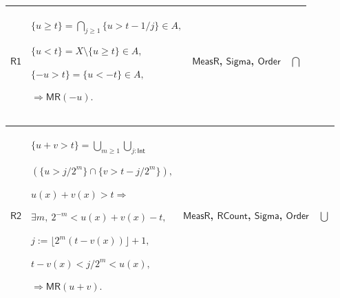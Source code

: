 \documentclass[11pt]{amsart}
\newlength{\FTCFourColumnBody}
\begin{document}
{\noindent
\begin{tabular}{|@{}>{\centering\arraybackslash}m{0.078431\FTCFourColumnBody}|>{\centering\arraybackslash}m{0.535947\FTCFourColumnBody}|>{\centering\arraybackslash}m{0.281045\FTCFourColumnBody}|>{\centering\arraybackslash}m{0.104575\FTCFourColumnBody}|}\hline
\hypertarget{dct:R1}{$\displaystyle \textsf{R1}$} & $\displaystyle \{u\ge t\}=\bigcap_{j\ge1}\{u>t-1/j\}\in A,$\par
$\displaystyle \{u<t\}=X\setminus\{u\ge t\}\in A,$\par
$\displaystyle \{-u>t\}=\{u<-t\}\in A,$\par
$\displaystyle \Rightarrow\textsf{MR}(-u).$ & \hyperlink{dctdef:MeasR}{$\displaystyle \textsf{MeasR}$}, \hyperlink{ax:Sigma}{$\displaystyle \textsf{Sigma}$}, \hyperlink{ax:Order}{$\displaystyle \textsf{Order}$} & $\displaystyle \bigcap$\\ \hline
\end{tabular}%
\par\setlength{\parskip}{0pt}\nointerlineskip
\noindent
\begin{tabular}{|@{}>{\centering\arraybackslash}m{0.078431\FTCFourColumnBody}|>{\centering\arraybackslash}m{0.535947\FTCFourColumnBody}|>{\centering\arraybackslash}m{0.281045\FTCFourColumnBody}|>{\centering\arraybackslash}m{0.104575\FTCFourColumnBody}|}\hline
\hypertarget{dct:R2}{$\displaystyle \textsf{R2}$} & $\displaystyle \{u+v>t\}=\bigcup_{m\ge1}\bigcup_{j:\textsf{Int}}$\par
$\displaystyle (\{u>j/2^m\}\cap\{v>t-j/2^m\}),$\par
$\displaystyle u(x)+v(x)>t\Rightarrow$\par
$\displaystyle \exists m,\ 2^{-m}<u(x)+v(x)-t,$\par
$\displaystyle j:=\lfloor2^m(t-v(x))\rfloor+1,$\par
$\displaystyle t-v(x)<j/2^m<u(x),$\par
$\displaystyle \Rightarrow\textsf{MR}(u+v).$ & \hyperlink{dctdef:MeasR}{$\displaystyle \textsf{MeasR}$}, \hyperlink{dct:RCount}{$\displaystyle \textsf{RCount}$}, \hyperlink{ax:Sigma}{$\displaystyle \textsf{Sigma}$}, \hyperlink{ax:Order}{$\displaystyle \textsf{Order}$} & $\displaystyle \bigcup$\\ \hline
\end{tabular}%
\par\setlength{\parskip}{0pt}\nointerlineskip
\noindent
\begin{tabular}{|@{}>{\centering\arraybackslash}m{0.078431\FTCFourColumnBody}|>{\centering\arraybackslash}m{0.535947\FTCFourColumnBody}|>{\centering\arraybackslash}m{0.281045\FTCFourColumnBody}|>{\centering\arraybackslash}m{0.104575\FTCFourColumnBody}|}\hline

\end{tabular}}
\end{document}
